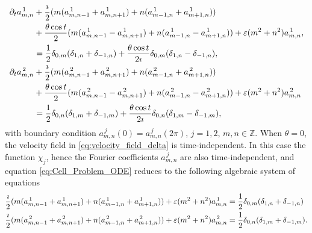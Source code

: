 \documentclass{article}
\begin{document}
\begin{align}\label{eq:Cell_Problem_ODE}
  \partial_ta^{\,1}_{m,n}
    &+\frac{\imath}{2}(m(a^{\,1}_{m,n-1}+a^{\,1}_{m,n+1})+n(a^{\,1}_{m-1,n}+a^{\,1}_{m+1,n}))
    \\
    &+\frac{\theta\cos{t}}{2}(m(a^{\,1}_{m,n-1}-a^{\,1}_{m,n+1})+n(a^{\,1}_{m-1,n}-a^{\,1}_{m+1,n}))
    +\varepsilon(m^2+n^2)a^{\,1}_{m,n}, 
    \notag\\
    &=\frac{1}{2}\delta_{0,m}(\delta_{1,n}+\delta_{-1,n})
          +\frac{\theta\cos{t}}{2\imath}\delta_{0,m}(\delta_{1,n}-\delta_{-1,n}),
    \notag\\
 \partial_ta^{\,2}_{m,n}
    &+\frac{\imath}{2}(m(a^{\,2}_{m,n-1}+a^{\,2}_{m,n+1})+n(a^{\,2}_{m-1,n}+a^{\,2}_{m+1,n}))
    \notag\\
    &+\frac{\theta\cos{t}}{2}(m(a^{\,2}_{m,n-1}-a^{\,2}_{m,n+1})+n(a^{\,2}_{m-1,n}-a^{\,2}_{m+1,n}))
    +\varepsilon(m^2+n^2)a^{\,2}_{m,n}
    \notag\\
    &=\frac{1}{2}\delta_{0,n}(\delta_{1,m}+\delta_{-1,m})
          +\frac{\theta\cos{t}}{2\imath}\delta_{0,n}(\delta_{1,m}-\delta_{-1,m}),
    \notag          
\end{align}
%
with  boundary condition $a^{\,j}_{m,n}(0)=a^{\,j}_{m,n}(2\pi)$, $j=1,2$,
$m,n\in\mathbb{Z}$. When $\theta=0$, the velocity field in
\eqref{eq:velocity_field_delta} is time-independent. In this case the
function $\chi_j$, hence the Fourier coefficients $a^{\,j}_{m,n}$ are
also time-independent, and equation \eqref{eq:Cell_Problem_ODE}
reduces to the following algebraic system of equations
%
\begin{align}\label{eq:Cell_Problem_LinAlg}
    \frac{\imath}{2}(m(a^{\,1}_{m,n-1}+a^{\,1}_{m,n+1})+n(a^{\,1}_{m-1,n}+a^{\,1}_{m+1,n}))      
    +\varepsilon(m^2+n^2)a^{\,1}_{m,n}
    &=\frac{1}{2}\delta_{0,m}(\delta_{1,n}+\delta_{-1,n})          
    \\
    \frac{\imath}{2}(m(a^{\,2}_{m,n-1}+a^{\,2}_{m,n+1})+n(a^{\,2}_{m-1,n}+a^{\,2}_{m+1,n}))    
    +\varepsilon(m^2+n^2)a^{\,2}_{m,n}    
    &=\frac{1}{2}\delta_{0,n}(\delta_{1,m}+\delta_{-1,m}).       
    \notag          
\end{align}
%
\end{document}
